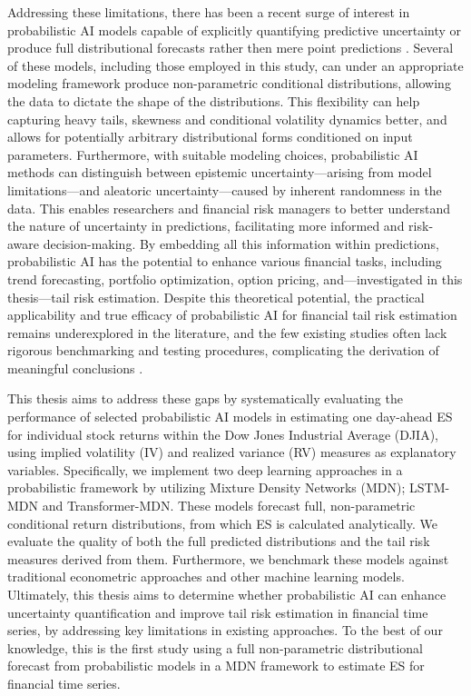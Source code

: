 Addressing these limitations, there has been a recent surge of interest in probabilistic AI models capable of explicitly quantifying predictive uncertainty or produce full distributional forecasts rather then mere point predictions \parencite{eggen2025probabilistic}. Several of these models, including those employed in this study, can under an appropriate modeling framework produce non-parametric conditional distributions, allowing the data to dictate the shape of the distributions. This flexibility can help capturing heavy tails, skewness and conditional volatility dynamics better, and allows for potentially arbitrary distributional forms conditioned on input parameters. Furthermore, with suitable modeling choices, probabilistic AI methods can distinguish between epistemic uncertainty—arising from model limitations—and aleatoric uncertainty—caused by inherent randomness in the data. This enables researchers and financial risk managers to better understand the nature of uncertainty in predictions, facilitating more informed and risk-aware decision-making. By embedding all this information within predictions, probabilistic AI has the potential to enhance various financial tasks, including trend forecasting, portfolio optimization, option pricing, and—investigated in this thesis—tail risk estimation. Despite this theoretical potential, the practical applicability and true efficacy of probabilistic AI for financial tail risk estimation remains underexplored in the literature, and the few existing studies often lack rigorous benchmarking and testing procedures, complicating the derivation of meaningful conclusions \parencite{eggen2025probabilistic}. 

This thesis aims to address these gaps by systematically evaluating the performance of selected probabilistic AI models in estimating one day-ahead ES for individual stock returns within the Dow Jones Industrial Average (DJIA), using implied volatility (IV) and realized variance (RV) measures as explanatory variables. Specifically, we implement two deep learning approaches in a probabilistic framework by utilizing Mixture Density Networks (MDN); LSTM-MDN and Transformer-MDN. These models forecast full, non-parametric conditional return distributions, from which ES is calculated analytically. We evaluate the quality of both the full predicted distributions and the tail risk measures derived from them. Furthermore, we benchmark these models against traditional econometric approaches and other machine learning models. Ultimately, this thesis aims to determine whether probabilistic AI can enhance uncertainty quantification and improve tail risk estimation in financial time series, by addressing key limitations in existing approaches. To the best of our knowledge, this is the first study using a full non-parametric distributional forecast from probabilistic models in a MDN framework to estimate ES for financial time series. 



